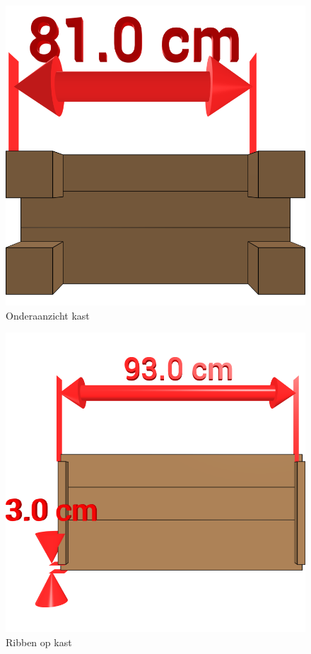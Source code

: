 \documentclass{article}
\begin{document}
\begin{figure}[h!]
    \centering
    \includegraphics[width=\textwidth]{scene 1 - bottom.png}
    \caption{Onderaanzicht kast}
\end{figure}

\begin{figure}[h!]
    \centering
    \includegraphics[width=\textwidth]{scene 2 - bottom rib.png}
    \caption{Ribben op kast}
\end{figure}
\end{document}
